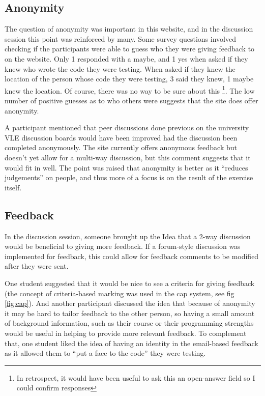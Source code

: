 \documentclass[a4paper,11pt]{report}
\begin{document}
\subsection{Anonymity}
The question of anonymity was important in this website, and in the discussion session this point was reinforced by many. Some survey questions involved checking if the participants were able to guess who they were giving feedback to on the website. Only 1 responded with a maybe, and 1 yes when asked if they knew who wrote the code they were testing. When asked if they knew the location of the person whose code they were testing, 3 said they knew, 1 maybe knew the location. Of course, there was no way to be sure about this \footnote{In retrospect, it would have been useful to ask this an open-answer field so I could confirm responses}. The low number of positive guesses as to who others were suggests that the site does offer anonymity.\par
A participant mentioned that peer discussions done previous on the university VLE discussion boards would have been improved had the discussion been completed anonymously. The site currently offers anonymous feedback but doesn't yet allow for a multi-way discussion, but this comment suggests that it would fit in well. The point was raised that anonymity is better as it ``reduces judgements'' on people, and thus more of a focus is on the result of the exercise itself.
\subsection{Feedback}
In the discussion session, someone brought up the Idea that a 2-way discussion would be beneficial to giving more feedback. If a forum-style discussion was implemented for feedback, this could allow for feedback comments to be modified after they were sent.\par
One student suggested that it would be nice to see a criteria for giving feedback (the concept of criteria-based marking was used in the cap system, see fig \ref{fig:cap}). And another participant discussed the idea that because of anonymity it may be hard to tailor feedback to the other person, so having a small amount of background information, such as their course or their programming strengths would be useful in helping to provide more relevant feedback. To complement that, one student liked the idea of having an identity in the email-based feedback as it allowed them to ``put a face to the code'' they were testing.
\end{document}
